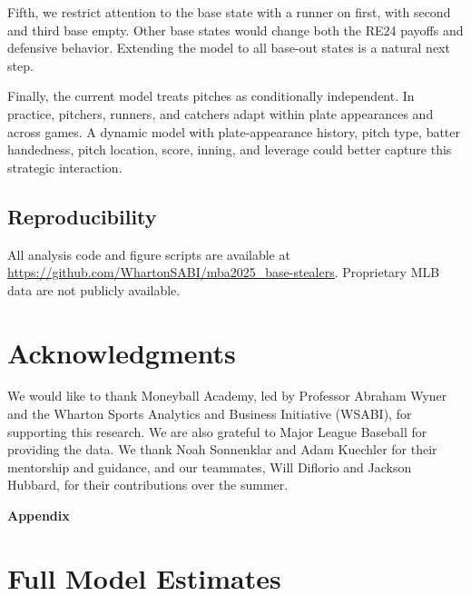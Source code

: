 \documentclass[12pt,letterpaper]{article}
\begin{document}
Fifth, we restrict attention to the base state with a runner on first, with second and third base empty. Other base states would change both the RE24 payoffs and defensive behavior. Extending the model to all base-out states is a natural next step.

Finally, the current model treats pitches as conditionally independent. In practice, pitchers, runners, and catchers adapt within plate appearances and across games. A dynamic model with plate-appearance history, pitch type, batter handedness, pitch location, score, inning, and leverage could better capture this strategic interaction.

\subsection{Reproducibility}

All analysis code and figure scripts are available at
\url{https://github.com/WhartonSABI/mba2025_base-stealers}. Proprietary MLB data are not publicly available.

\section{Acknowledgments}

We would like to thank Moneyball Academy, led by Professor Abraham Wyner and the Wharton Sports Analytics and Business Initiative (WSABI), for supporting this research. We are also grateful to Major League Baseball for providing the data. We thank Noah Sonnenklar and Adam Kuechler for their mentorship and guidance, and our teammates, Will Diflorio and Jackson Hubbard, for their contributions over the summer.




\clearpage
\appendix

\begin{center}
\Large\bfseries Appendix
\end{center}

\section{Full Model Estimates} \label{app:model-estimates}
\end{document}
